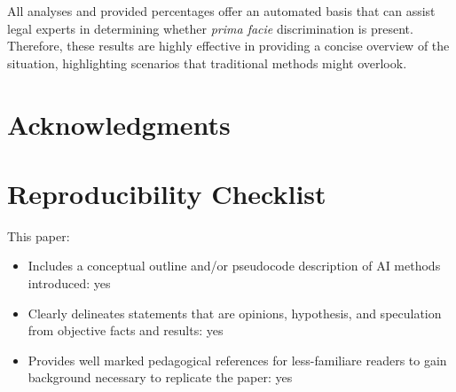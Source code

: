 \documentclass[letterpaper]{article} %
\begin{document}
All analyses and provided percentages offer an automated basis that can assist legal experts in determining whether \emph{prima facie} discrimination is present. Therefore, these results are highly effective in providing a concise overview of the situation, highlighting scenarios that traditional methods might overlook.


%
%

\section{Acknowledgments}

%


\section{Reproducibility Checklist}

This paper:
\begin{itemize}
	\item Includes a conceptual outline and/or pseudocode description of AI methods introduced: yes
	\item Clearly delineates statements that are opinions, hypothesis, and speculation from objective facts and results: yes
	\item Provides well marked pedagogical references for less-familiare readers to gain background necessary to replicate the paper: yes
\end{itemize}
\end{document}
